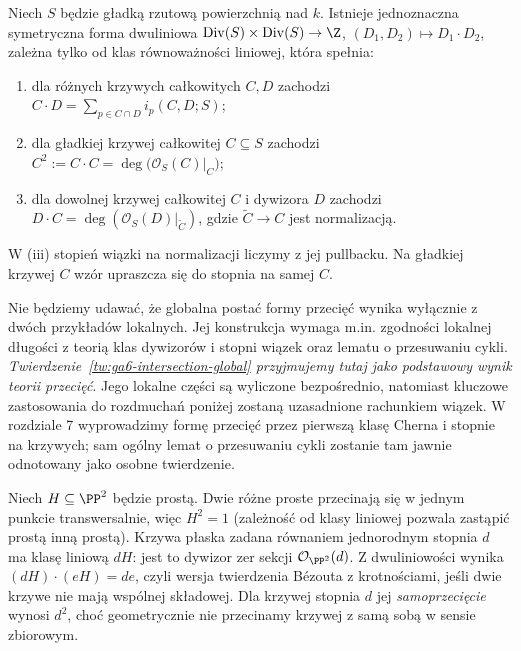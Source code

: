 \begin{twierdzenie}
\label{tw:ga6-intersection-global}
Niech $S$ będzie gładką rzutową powierzchnią nad $k$.
Istnieje jednoznaczna symetryczna forma dwuliniowa
$\operatorname{Div}(S)\times\operatorname{Div}(S)\to\Z$,
$(D_1,D_2)\mapsto D_1\cdot D_2$, zależna tylko od klas
równoważności liniowej, która spełnia:
\begin{enumerate}[label=(\roman*)]
\item dla różnych krzywych całkowitych $C,D$ zachodzi
$C\cdot D=\sum_{p\in C\cap D}i_p(C,D;S)$;
\item dla gładkiej krzywej całkowitej $C\subseteq S$
zachodzi $C^2:=C\cdot C=\deg\bigl(\mathcal O_S(C)|_C\bigr)$;
\item dla dowolnej krzywej całkowitej $C$ i dywizora $D$
zachodzi $D\cdot C=\deg(\mathcal O_S(D)|_{\widetilde C})$,
gdzie $\widetilde C\to C$ jest normalizacją.
\end{enumerate}
W (iii) stopień wiązki na normalizacji liczymy z jej
pullbacku. Na gładkiej krzywej $C$ wzór upraszcza się
do stopnia na samej $C$.
\end{twierdzenie}

\begin{uwaga}
Nie będziemy udawać, że globalna postać formy przecięć
wynika wyłącznie z dwóch przykładów lokalnych. Jej konstrukcja
wymaga m.in. zgodności lokalnej długości z teorią klas dywizorów
i stopni wiązek oraz lematu o przesuwaniu cykli.
\emph{Twierdzenie~\ref{tw:ga6-intersection-global} przyjmujemy tutaj
jako podstawowy wynik teorii przecięć}. Jego lokalne części
są wyliczone bezpośrednio, natomiast kluczowe zastosowania
do rozdmuchań poniżej zostaną uzasadnione rachunkiem wiązek.
W rozdziale 7 wyprowadzimy formę przecięć przez
pierwszą klasę Cherna i stopnie na krzywych;
sam ogólny lemat o przesuwaniu cykli zostanie tam jawnie
odnotowany jako osobne twierdzenie.
\end{uwaga}

\begin{przyklad}[Przecięcia w $\PP^2$]
\label{prz:ga6-p2}
Niech $H\subseteq\PP^2$ będzie prostą. Dwie różne proste
przecinają się w jednym punkcie transwersalnie,
więc $H^2=1$ (zależność od klasy liniowej pozwala zastąpić
prostą inną prostą). Krzywa płaska zadana równaniem jednorodnym
stopnia $d$ ma klasę liniową $dH$: jest to dywizor zer
sekcji $\mathcal O_{\PP^2}(d)$. Z dwuliniowości wynika
$(dH)\cdot(eH)=de$, czyli wersja twierdzenia Bézouta
z krotnościami, jeśli dwie krzywe nie mają wspólnej składowej.
Dla krzywej stopnia $d$ jej \emph{samoprzecięcie} wynosi $d^2$,
choć geometrycznie nie przecinamy krzywej z samą sobą
w sensie zbiorowym.
\end{przyklad}

